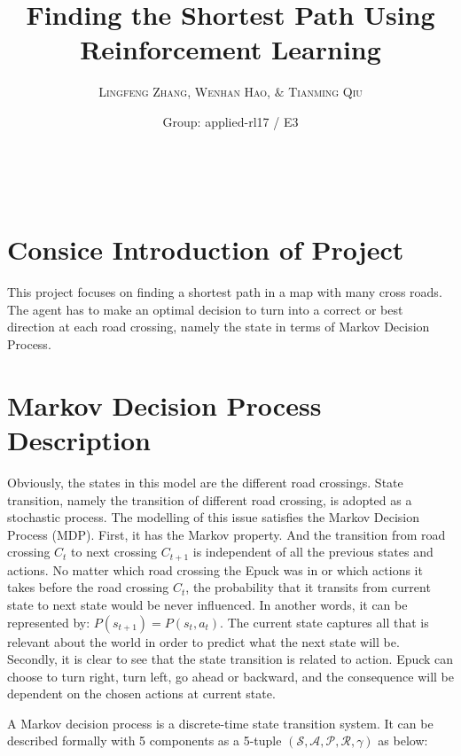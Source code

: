 \documentclass[a4paper, 11pt]{article} %
\title{\textbf{Finding the Shortest Path Using Reinforcement Learning}} %
\author{\textsc{Lingfeng Zhang, Wenhan Hao, $\&$ Tianming Qiu} %
\\{\textit{}}} %
\date{Group: applied-rl17 / E3} %
\makeatletter
\renewcommand{\maketitle}{ %
\begin{flushright} %
{\LARGE\@title} %

\vspace{50pt} %

{\large\@author} %
\\\@date %

\vspace{40pt} %
\end{flushright}
}
\makeatother
\begin{document}
\maketitle %




\section{Consice Introduction of Project}
This project focuses on finding a shortest path in a map with many cross roads. The agent has to make an optimal decision to turn into a correct or best direction at each road crossing, namely the state in terms of Markov Decision Process.


\section{Markov Decision Process Description}

Obviously, the states in this model are the different road crossings. State transition, namely the transition of different road crossing, is adopted as a stochastic process. The modelling of this issue satisfies the Markov Decision Process (MDP). 
First, it has the Markov property. And the transition from road crossing $C_{t}$ to next crossing $C_{t+1}$ is independent of all the previous states and actions. No matter which road crossing the Epuck was in or which actions it takes before the road crossing $C_{t}$, the probability that it transits from current state to next state would be never influenced. In another words, it can be represented by: $P(s_{t+1})=P(s_{t},a_{t})$. The current state captures all that is relevant about the world in order to predict what the next state will be.
Secondly, it is clear to see that the state transition is related to action. Epuck can choose to turn right, turn left, go ahead or backward, and the consequence will be dependent on the chosen actions at current state. 

A Markov decision process is a discrete-time state transition system. It can be described formally with 5 components as a 5-tuple $(\mathcal{S,A,P,R},\gamma)$ as below:
\end{document}
